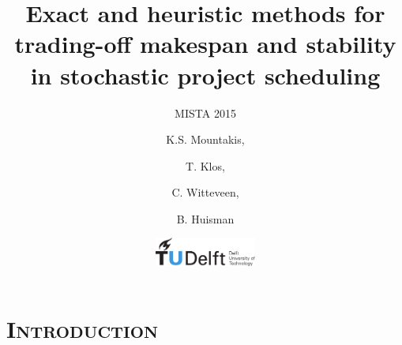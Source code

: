 \documentclass[xcolor=x11names,9pt]{beamer}
\begin{document}

\section{\scshape Introduction}
\begin{frame}
 
 	\title{Exact and heuristic methods for trading-off makespan and stability in stochastic project scheduling}
 	\subtitle{\textsc{MISTA 2015}}
	\author{
		K.S. Mountakis, \and T. Klos, \and C. Witteveen, \and B. Huisman  
	}
	\date{
 		\includegraphics[width=0.25\textwidth]{tu_logo_wide}
		\\
	} 
	\titlepage
	
\end{frame}








\end{document}
